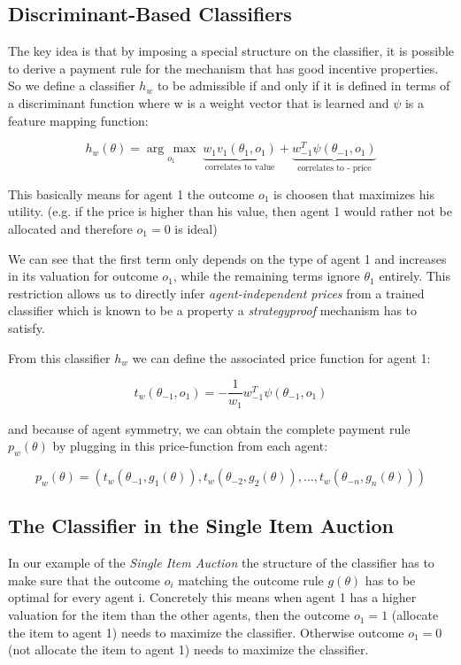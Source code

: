 \documentclass[]{article}
\newcommand{\argmax}[1]{\underset{#1}{\operatorname{arg}\,\operatorname{max}}\;}
\begin{document}
\newpage
\subsection{Discriminant-Based Classifiers}
The key idea is that by imposing a special structure on the classifier, it is possible to derive a payment rule for the mechanism that has good incentive properties. So we define a classifier $h_{w}$ to be admissible if and only if it is defined in terms of a discriminant function where w is a weight vector that is learned and $\psi$ is a feature mapping function:

\begin{equation*}
h_{w}(\theta) = \argmax{o_{1}} \underbrace{w_{1}v_{1}(\theta_{1},o_{1})}_{\text{correlates to value}} + \underbrace{w_{-1}^T \psi(\theta_{-1},o_{1})}_{\text{correlates to - price}}
\end{equation*}


\noindent This basically means for agent 1 the outcome $o_{1}$ is choosen that maximizes his utility. (e.g. if the price is higher than his value, then agent 1 would rather not be allocated and therefore $o_{1}=0$ is ideal) 

\noindent We can see that the first term only depends on the type of agent 1 and increases in its valuation for outcome $o_{1}$, while the remaining terms ignore $\theta_{1}$ entirely. This restriction allows us to directly infer \emph{agent-independent prices} from a trained classifier which is known to be a property a \emph{strategyproof} mechanism has to satisfy.


\noindent From this classifier $h_{w}$ we can define the associated price function for agent 1:

\begin{equation*}
	t_{w}(\theta_{-1}, o_{1}) = - \frac{1}{w_{1}} w_{-1}^T \psi(\theta_{-1},o_{1})
\end{equation*}

\noindent and because of agent symmetry, we can obtain the complete payment rule $p_{w}(\theta)$ by plugging in this price-function from each agent:

\begin{equation*}
	p_{w}(\theta) = (t_{w}(\theta_{-1},g_{1}(\theta)), t_{w}(\theta_{-2},g_{2}(\theta)),..., t_{w}(\theta_{-n},g_{n}(\theta)))
\end{equation*}

\subsection{The Classifier in the Single Item Auction}
\noindent In our example of the \emph{Single Item Auction} the structure of the classifier has to make sure that the outcome $o_{i}$ matching the outcome rule $g(\theta)$ has to be optimal for every agent i. Concretely this means when agent 1 has a higher valuation for the item than the other agents, then the outcome $o_{1} = 1$ (allocate the item to agent 1) needs to maximize the classifier. Otherwise outcome $o_{1}=0$ (not allocate the item to agent 1) needs to maximize the classifier.
\end{document}
